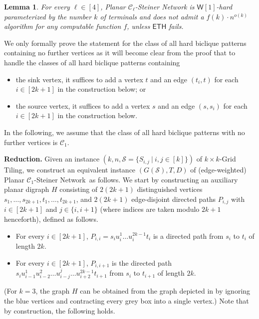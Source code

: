 \documentclass[a4paper,11pt]{article}
\theoremstyle{plain}
\newtheorem{lemma}[theorem]{Lemma}
\newtheorem{identification rule}{Identification Rule}
\theoremstyle{definition}
\theoremstyle{remark}
\begin{document}
\begin{lemma}
\label{lem:cleanedbiclique}
For every $\ell \in [4]$,
{\sc Planar $\mathcal{C}_\ell$-Steiner Network} is $\mathsf{W}[1]$-hard parameterized by the number $k$ of terminals and does not admit a $f(k) \cdot n^{o(k)}$ algorithm for any computable function $f$,
unless $\mathsf{ETH}$ fails.
\end{lemma}

We only formally prove the statement for the class of all hard biclique patterns containing no further vertices 
as it will become clear from the proof that to handle the classes of all hard biclique patterns containing
\begin{itemize}
\item the sink vertex, it suffices to add a vertex $t$ and an edge $(t_i,t)$ for each $i \in [2k+1]$ in the construction below; or
\item the source vertex, it suffices to add a vertex $s$ and an edge $(s,s_i)$ for each $i \in [2k+1]$ in the construction below.
\end{itemize} 
In the following, we assume that the class of all hard biclique patterns with no further vertices is $\mathcal{C}_1$.\\

\newcommand{\biclique}{{\sc Planar $\mathcal{C}_1$-Steiner Network}}

\noindent
\textbf{Reduction.} Given an instance $(k,n,\mathcal{S}=\{S_{i,j}~|~i,j \in [k]\})$ of {\sc $k \times k$-Grid Tiling}, we construct an equivalent instance $(G(\mathcal{S}),T,D)$ of (edge-weighted) \biclique\ as follows. We start by constructing an auxiliary planar digraph $H$ consisting of $2(2k+1)$ distinguished vertices $s_1,\ldots,s_{2k+1},t_1,\ldots,t_{2k+1}$, and $2(2k+1)$ edge-disjoint directed paths $P_{i,j}$ with $i \in [2k+1]$ and $j \in \{i,i+1\}$ (where indices are taken modulo $2k+1$ henceforth), defined as follows.
\begin{itemize}
\item For every $i \in [2k+1]$, $P_{i,i}= s_iu_i^1\ldots u_i^{2k-1}t_i$ is a directed path from $s_i$ to $t_i$ of length $2k$.
\item For every $i \in [2k+1]$, $P_{i,i+1}$ is the directed path $s_i u^1_{i-1}u^2_{i-2}\ldots u^j_{i-j}\ldots u^{2k-1}_{i+2}t_{i+1}$ from $s_i$ to $t_{i+1}$ of length $2k$.
\end{itemize}
(For $k=3$, the graph $H$ can be obtained from the graph depicted in  by ignoring the blue vertices and contracting every grey box into a single vertex.) Note that by construction, the following holds.
\end{document}
